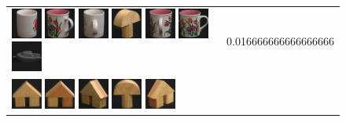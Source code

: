 \begin{figure}[tbp]
\begin{center}
\begin{tabular}{m{11cm} | m{3cm} |}
\includegraphics[width=1cm]{coil/beeld-38.eps}
\includegraphics[width=1cm]{coil/beeld-10.eps}
\includegraphics[width=1cm]{coil/beeld-41.eps}
\includegraphics[width=1cm]{coil/beeld-3.eps}
\includegraphics[width=1cm]{coil/beeld-11.eps}
\includegraphics[width=1cm]{coil/beeld-6.eps}
\includegraphics[width=1cm]{coil/beeld-24.eps}
& {\scriptsize 0.016666666666666666}
\\
\includegraphics[width=1cm]{coil/beeld-42.eps}
\includegraphics[width=1cm]{coil/beeld-43.eps}
\includegraphics[width=1cm]{coil/beeld-46.eps}
\includegraphics[width=1cm]{coil/beeld-0.eps}
\includegraphics[width=1cm]{coil/beeld-45.eps}

\end{tabular}
\end{center}
\end{figure}
